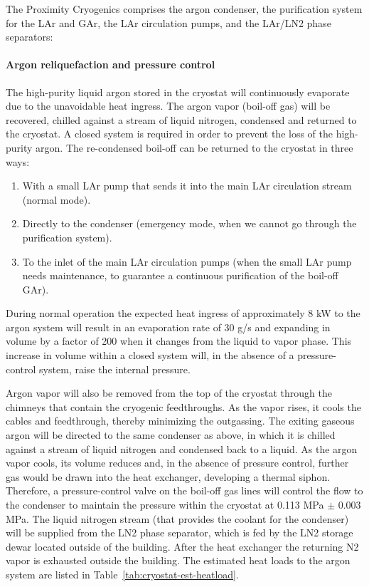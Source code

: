 The Proximity Cryogenics comprises the argon condenser, the purification system for the LAr and GAr, the LAr circulation pumps, and the LAr/LN2 phase separators:

\paragraph{Argon reliquefaction and pressure control}

The high-purity liquid argon stored in the cryostat will continuously evaporate due to the unavoidable heat ingress. The argon vapor (boil-off gas) will be recovered, chilled against a stream of liquid nitrogen, condensed and returned to the cryostat. A closed system is required in order to prevent the loss of the high-purity argon. The re-condensed boil-off can be returned to the cryostat in three ways:
\begin{enumerate}
\item With a small LAr pump that sends it into the main LAr circulation stream (normal mode).
\item Directly to the condenser (emergency mode, when we cannot go through the purification system).
\item To the inlet of the main LAr circulation pumps (when the small LAr pump needs maintenance, to guarantee a continuous purification of the boil-off GAr).
\end{enumerate}

During normal operation the expected heat ingress of approximately 8 kW to the argon system will result in an evaporation rate of 30 g/s and expanding in volume by a factor of 200 when it changes from the liquid to vapor phase. This increase in volume within a closed system will, in the absence of a pressure-control system, raise the internal pressure.

Argon vapor will also be removed from the top of the cryostat through the chimneys that contain the cryogenic feedthroughs. As the vapor rises, it cools the cables and feedthrough, thereby minimizing the outgassing. The exiting gaseous argon will be directed to the same condenser as above, in which it is chilled against a stream of liquid nitrogen and condensed back to a liquid. As the argon vapor cools, its volume reduces and, in the absence of pressure control, further gas would be drawn into the heat exchanger, developing a thermal siphon. Therefore, a pressure-control valve on the boil-off gas lines will control the flow to the condenser to maintain the pressure within the cryostat at 0.113 MPa $\pm$ 0.003 MPa. The liquid nitrogen stream (that provides the coolant for the condenser) will be supplied from the LN2 phase separator, which is fed by the LN2 storage dewar located outside of the building. After the heat exchanger the returning N2 vapor is exhausted outside the building. The estimated heat loads to the argon system are listed in Table~\ref{tab:cryostat-est-heatload}.

